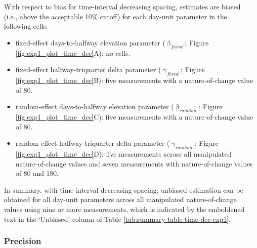 \documentclass[
12pt, %
twoside,
english]{guelphthesis}
\theoremstyle{definition}
\theoremstyle{definition}
\theoremstyle{definition}
\theoremstyle{definition}
\theoremstyle{remark}
\begin{document}
With respect to bias for time-interval decreasing spacing, estimates are biased (i.e., above the acceptable 10\% cutoff) for each day-unit parameter in the following cells:
\begin{itemize}
\tightlist
\item
  fixed-effect days-to-halfway elevation parameter (\(\upbeta_{fixed}\); Figure \ref{fig:exp1_plot_time_dec}A): no cells.
\item
  fixed-effect halfway-triquarter delta parameter (\(\upgamma_{fixed}\); Figure \ref{fig:exp1_plot_time_dec}B): five measurements with a nature-of-change value of 80.
\item
  random-effect days-to-halfway elevation parameter (\(\upbeta_{random}\); Figure \ref{fig:exp1_plot_time_dec}C): five measurements with a nature-of-change value of 80.
\item
  random-effect halfway-triquarter delta parameter (\(\upgamma_{random}\); Figure \ref{fig:exp1_plot_time_dec}D): five measurements across all manipulated nature-of-change values and seven measurements with nature-of-change values of 80 and 180.
\end{itemize}
In summary, with time-interval decreasing spacing, unbiased estimation can be obtained for all day-unit parameters across all manipulated nature-of-change values using nine or more measurements, which is indicated by the emboldened text in the `Unbiased' column of Table \ref{tab:summary-table-time-dec-exp1}.

\hypertarget{precision-time-dec-exp1}{%
\subsubsection{Precision}\label{precision-time-dec-exp1}}
\end{document}
